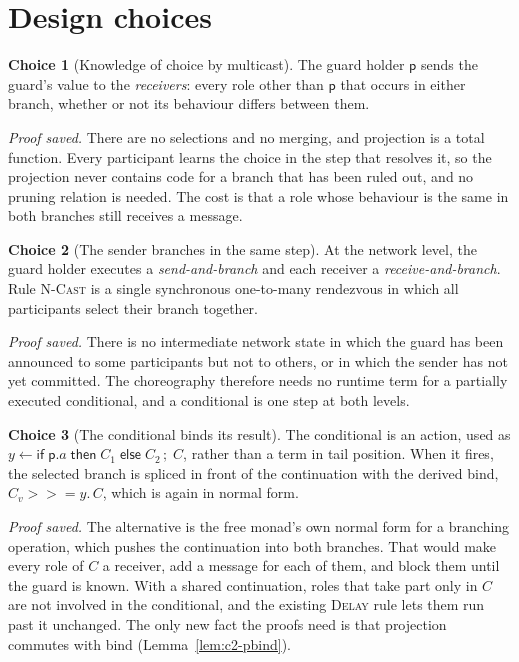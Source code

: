 \documentclass[11pt]{report}
\theoremstyle{plain}
\theoremstyle{definition}
\newtheorem{choice}{Choice}[chapter]
\theoremstyle{remark}
\newcommand{\kw}[1]{\mathsf{#1}}
\newcommand{\pp}{\mathsf{p}}
\newcommand{\bind}[3]{#1 \leftarrow #2\,;\;#3}
\newcommand{\cif}[4]{\kw{if}\;#1.#2\;\kw{then}\;#3\;\kw{else}\;#4}
\newcommand{\mbind}[3]{#1 \mathbin{>\!\!>\!\!=} #2.\,#3}
\newcommand{\rn}[1]{{\normalfont\scshape #1}}
\begin{document}
\section{Design choices}
\label{sec:c2-choices}

\begin{choice}[Knowledge of choice by multicast]\label{cho:c2-multicast}
  The guard holder $\pp$ sends the guard's value to the \emph{receivers}: every
  role other than $\pp$ that occurs in either branch, whether or not its
  behaviour differs between them.

  \emph{Proof saved.}  There are no selections and no merging, and
  projection is a total function.  Every participant learns the choice in the
  step that resolves it, so the projection never contains code for a branch
  that has been ruled out, and no pruning relation is needed.  The cost is
  that a role whose behaviour is the same in both branches still receives a
  message.
\end{choice}

\begin{choice}[The sender branches in the same step]\label{cho:c2-sendbranch}
  At the network level, the guard holder executes a \emph{send-and-branch}
  and each receiver a \emph{receive-and-branch}.  Rule \rn{N-Cast} is a
  single synchronous one-to-many rendezvous in which all participants select
  their branch together.

  \emph{Proof saved.}  There is no intermediate network state in which the
  guard has been announced to some participants but not to others, or in
  which the sender has not yet committed.  The choreography therefore needs
  no runtime term for a partially executed conditional, and a conditional is
  one step at both levels.
\end{choice}

\begin{choice}[The conditional binds its result]\label{cho:c2-bind}
  The conditional is an action, used as $\bind{y}{\cif{\pp}{a}{C_1}{C_2}}{C}$,
  rather than a term in tail position.  When it fires, the selected branch is
  spliced in front of the continuation with the derived bind,
  $\mbind{C_v}{y}{C}$, which is again in normal form.

  \emph{Proof saved.}  The alternative is the free monad's own normal form
  for a branching operation, which pushes the continuation into both branches.
  That would make every role of $C$ a receiver, add a message for each of
  them, and block them until the guard is known.  With a shared
  continuation, roles that take part only in $C$ are not involved in the
  conditional, and the existing \rn{Delay} rule lets them run past it
  unchanged.  The only new fact the proofs need is that projection commutes
  with bind (Lemma~\ref{lem:c2-pbind}).
\end{choice}
\end{document}
